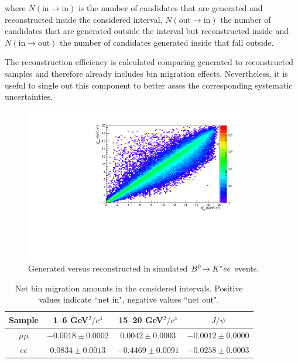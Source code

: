 \noindent
where $N(\text{in} \to \text{in})$ is the number of candidates that are generated and
reconstructed inside the considered interval, $N(\text{out} \to \text{in})$ the number of 
candidates that are generated outside the interval but reconstructed inside and
$N(\text{in} \to \text{out})$ the number of candidates generated inside that fall outside.

The reconstruction efficiency is calculated comparing generated to reconstructed samples
and therefore already includes bin migration effects. Nevertheless, it is useful to single
out this component to better asses the corresponding systematic uncertainties.

\begin{figure}[h!]
\centering
\includegraphics[width=0.85\textwidth]{RKst/figs/bin_mig.pdf}
\caption{Generated versus reconstructed \qsq in simulated ${{B}^0}\!\rightarrow {\ensuremath{{K}^*}} ee$ events.}
\label{fig:ee_bin_mig}
\end{figure}

\begin{table}[bh]
\label{tab:bin_mig}
\centering
\caption{Net bin migration amounts in the considered \qsq intervals.
Positive values indicate ``net in", negative values ``net out".}
\begin{tabular}{|c|c|c|c|}
\hline
 Sample 			& 1--6 GeV$^2/c^4$ 				& 15--20 GeV$^2/c^4$ 				& $J/\psi$  \\ \hline
$\mu\mu$ 	& $ -0.0018  \pm  0.0002 $ & $ 0.0042  \pm  0.0003 $ & $ -0.0012  \pm  0.0000 $ \\
$ee$ 	& $ 0.0834  \pm  0.0013 $ & $ -0.4469  \pm  0.0091 $ & $ -0.0258  \pm  0.0003 $ \\
\hline 
 \end{tabular}
\end{table}

